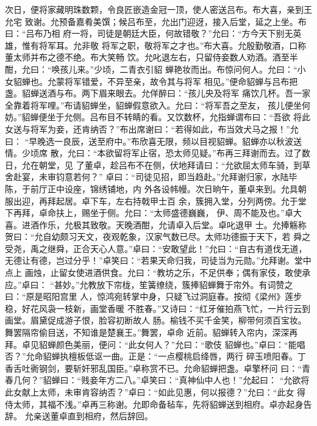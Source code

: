 次日，便将家藏明珠数颗，令良匠嵌造金冠一顶，使人密送吕布。布大喜，亲到王允宅
致谢。允预备嘉肴美馔；候吕布至，允出门迎迓，接入后堂，延之上坐。布曰：“吕布乃相
府一将，司徒是朝廷大臣，何故错敬？”允曰：“方今天下别无英雄，惟有将军耳。允非敬
将军之职，敬将军之才也。”布大喜。允殷勤敬酒，口称董太师并布之德不绝。布大笑畅
饮。允叱退左右，只留侍妾数人劝酒。酒至半酣，允曰：“唤孩儿来。”少顷，二青衣引貂
蝉艳妆而出。布惊问何人。允曰：“小女貂蝉也。允蒙将军错爱，不异至亲，故令其与将军
相见。”便命貂蝉与吕布把盏。貂蝉送酒与布。两下眉来眼去。允佯醉曰：“孩儿央及将军
痛饮几杯。吾一家全靠着将军哩。”布请貂蝉坐，貂蝉假意欲入。允曰：“将军吾之至友，
孩儿便坐何妨。”貂蝉便坐于允侧。吕布目不转睛的看。又饮数杯，允指蝉谓布曰：“吾欲
将此女送与将军为妾，还肯纳否？”布出席谢曰：“若得如此，布当效犬马之报！”允曰：
“早晚选一良辰，送至府中。”布欣喜无限，频以目视貂蝉。貂蝉亦以秋波送情。少顷席
散，允曰：“本欲留将军止宿，恐太师见疑。”布再三拜谢而去。过了数日，允在朝堂，见
了董卓，趁吕布不在侧，伏地拜请曰：“允欲屈太师车骑，到草舍赴宴，未审钧意若何？”
卓曰：“司徒见招，即当趋赴。”允拜谢归家，水陆毕陈，于前厅正中设座，锦绣铺地，内
外各设帏幔。次日晌午，董卓来到。允具朝服出迎，再拜起居。卓下车，左右持戟甲士百
余，簇拥入堂，分列两傍。允于堂下再拜，卓命扶上，赐坐于侧。允曰：“太师盛德巍巍，
伊、周不能及也。”卓大喜。进酒作乐，允极其致敬。天晚酒酣，允请卓入后堂。卓叱退甲
士。允捧觞称贺曰：“允自幼颇习天文，夜观乾象，汉家气数已尽。太师功德振于天下，若
舜之受尧，禹之继舜，正合天心人意。”卓曰：“安敢望此！”允曰：“自古有道伐无道，
无德让有德，岂过分乎！”卓笑曰：“若果天命归我，司徒当为元勋。”允拜谢。堂中点上
画烛，止留女使进酒供食。允曰：“教坊之乐，不足供奉；偶有家伎，敢使承应。”卓曰：
“甚妙。”允教放下帘栊，笙簧缭绕，簇捧貂蝉舞于帘外。有词赞之曰：“原是昭阳宫里
人，惊鸿宛转掌中身，只疑飞过洞庭春。按彻《梁州》莲步稳，好花风袅一枝新，画堂香暖
不胜春。”又诗曰：“红牙催拍燕飞忙，一片行云到画堂。眉黛促成游子恨，脸容初断故人
肠。榆钱不买千金笑，柳带何须百宝妆。舞罢隔帘偷目送，不知谁是楚襄王。”舞罢，卓命
近前。貂蝉转入帘内，深深再拜。卓见貂蝉颜色美丽，便问：“此女何人？”允曰：“歌伎
貂蝉也。”卓曰：“能唱否？”允命貂蝉执檀板低讴一曲。正是：“一点樱桃启绛唇，两行
碎玉喷阳春。丁香舌吐衠钢剑，要斩奸邪乱国臣。”卓称赏不已。允命貂蝉把盏。卓擎杯问
曰：“青春几何？”貂蝉曰：“贱妾年方二八。”卓笑曰：“真神仙中人也！”允起曰：
“允欲将此女献上太师，未审肯容纳否？”卓曰：“如此见惠，何以报德？”允曰：“此女
得侍太师，其福不浅。”卓再三称谢。允即命备毡车，先将貂蝉送到相府。卓亦起身告辞。
允亲送董卓直到相府，然后辞回。

